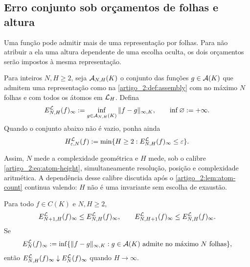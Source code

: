 \subsection{Erro conjunto sob orçamentos de folhas e altura}
\label{artigo_2:subsec:joint-budget}

Uma função pode admitir mais de uma representação por folhas. Para não
atribuir a ela uma altura dependente de uma escolha oculta, os dois
orçamentos serão impostos à mesma representação.

\begin{definition}\label{map:artigo_2:3.13}
\label{artigo_2:def:joint-error}
Para inteiros $N,H\ge2$, seja $\mathcal{A}_{N,H}(K)$ o conjunto das funções
$g\in\mathcal{A}(K)$ que admitem uma representação como na
\cref{artigo_2:def:assembly} com no máximo $N$ folhas e com todos os átomos em
$\mathcal{L}_H$. Defina
\begin{equation}
 E_{N,H}^{\mathcal{L}}(f)_\infty
 :=\inf_{g\in\mathcal{A}_{N,H}(K)}\|f-g\|_{\infty,K},
 \qquad \inf\varnothing:=+\infty.
 \label{artigo_2:eq:joint-error}
\end{equation}
Quando o conjunto abaixo não é vazio, ponha ainda
\begin{equation}
 H_{\varepsilon,N}^{\mathcal{L}}(f)
 :=\min\{H\ge2:E_{N,H}^{\mathcal{L}}(f)_\infty\le\varepsilon\}.
 \label{artigo_2:eq:height-for-accuracy}
\end{equation}
\end{definition}

Assim, $N$ mede a complexidade geométrica e $H$ mede, sob o calibre
\eqref{artigo_2:eq:atom-height}, simultaneamente resolução, posição e complexidade
aritmética. A dependência desse calibre discutida após o
\cref{artigo_2:lem:atom-count} continua valendo: $H$ não é uma invariante sem escolha
de exaustão.

\begin{proposition}\label{map:artigo_2:3.14}
\label{artigo_2:prop:joint-error-monotonicity}
Para todo $f\in C(K)$ e $N,H\ge2$,
\begin{equation}
 E_{N+1,H}^{\mathcal{L}}(f)_\infty\le E_{N,H}^{\mathcal{L}}(f)_\infty,
 \qquad
 E_{N,H+1}^{\mathcal{L}}(f)_\infty\le E_{N,H}^{\mathcal{L}}(f)_\infty.
 \label{artigo_2:eq:joint-error-monotonicity}
\end{equation}
Se
\[
 E_N^{\mathcal{L}}(f)_\infty
 :=\inf\{\|f-g\|_{\infty,K}:g\in\mathcal{A}(K)
       \text{ admite no máximo $N$ folhas}\},
\]
então $E_{N,H}^{\mathcal{L}}(f)_\infty\downarrow
E_N^{\mathcal{L}}(f)_\infty$ quando $H\to\infty$.
\end{proposition}

